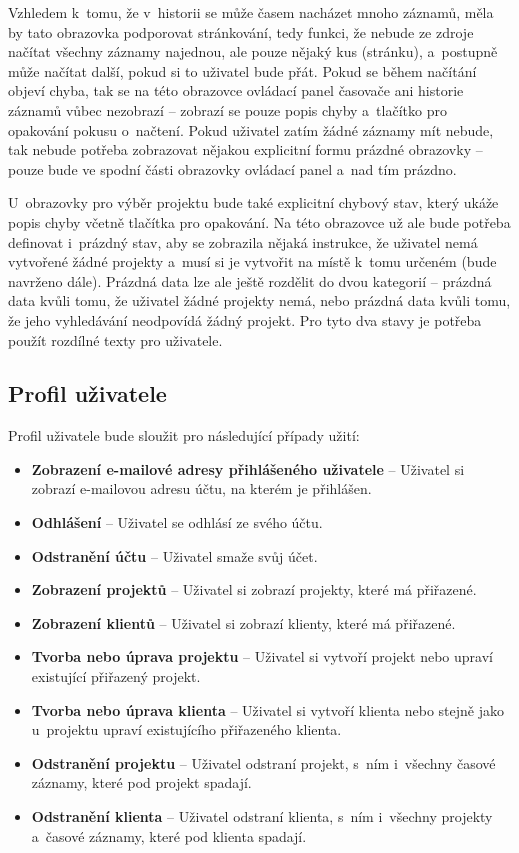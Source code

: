 Vzhledem k~tomu, že v~historii se může časem nacházet mnoho záznamů, měla by tato obrazovka podporovat stránkování, tedy funkci, že nebude ze zdroje načítat všechny záznamy najednou, ale pouze nějaký kus (stránku), a~postupně může načítat další, pokud si to uživatel bude přát. Pokud se během načítání objeví chyba, tak se na této obrazovce ovládací panel časovače ani historie záznamů vůbec nezobrazí – zobrazí se pouze popis chyby a~tlačítko pro opakování pokusu o~načtení. Pokud uživatel zatím žádné záznamy mít nebude, tak nebude potřeba zobrazovat nějakou explicitní formu prázdné obrazovky – pouze bude ve spodní části obrazovky ovládací panel a~nad tím prázdno.

U~obrazovky pro výběr projektu bude také explicitní chybový stav, který ukáže popis chyby včetně tlačítka pro opakování. Na této obrazovce už ale bude potřeba definovat i~prázdný stav, aby se zobrazila nějaká instrukce, že uživatel nemá vytvořené žádné projekty a~musí si je vytvořit na místě k~tomu určeném (bude navrženo dále). Prázdná data lze ale ještě rozdělit do dvou kategorií – prázdná data kvůli tomu, že uživatel žádné projekty nemá, nebo prázdná data kvůli tomu, že jeho vyhledávání neodpovídá žádný projekt. Pro tyto dva stavy je potřeba použít rozdílné texty pro uživatele.

\subsection{Profil uživatele}\label{feature-profile}

Profil uživatele bude sloužit pro následující případy užití:
\begin{itemize}
\item\textbf{Zobrazení e-mailové adresy přihlášeného uživatele} – Uživatel si zobrazí e-mailovou adresu účtu, na kterém je přihlášen.
\item\textbf{Odhlášení} – Uživatel se odhlásí ze svého účtu.
\item\textbf{Odstranění účtu} – Uživatel smaže svůj účet.
\item\textbf{Zobrazení projektů} – Uživatel si zobrazí projekty, které má přiřazené.
\item\textbf{Zobrazení klientů} – Uživatel si zobrazí klienty, které má přiřazené.
\item\textbf{Tvorba nebo úprava projektu} – Uživatel si vytvoří projekt nebo upraví existující přiřazený projekt.
\item\textbf{Tvorba nebo úprava klienta} – Uživatel si vytvoří klienta nebo stejně jako u~projektu upraví existujícího přiřazeného klienta.
\item\textbf{Odstranění projektu} – Uživatel odstraní projekt, s~ním i~všechny časové záznamy, které pod projekt spadají.
\item\textbf{Odstranění klienta} – Uživatel odstraní klienta, s~ním i~všechny projekty a~časové záznamy, které pod klienta spadají.
\end{itemize}

